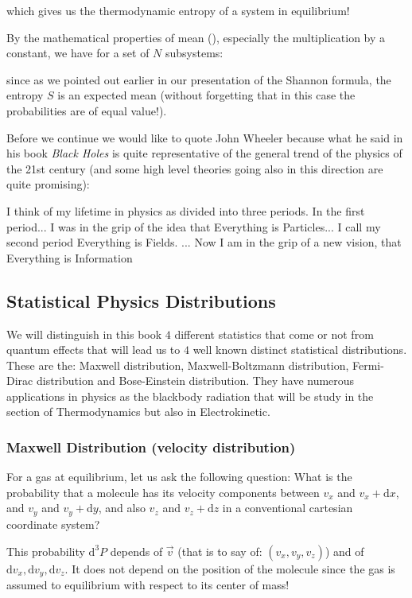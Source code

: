 	which gives us the thermodynamic entropy of a system in equilibrium!
	
	By the mathematical properties of mean (), especially the multiplication by a constant, we have for a set of $N$ subsystems:
	
	since as we pointed out earlier in our presentation of the Shannon formula, the entropy $S$ is an expected mean (without forgetting that in this case the probabilities are of equal value!).
	
	Before we continue we would like to quote John Wheeler because what he said in his book \textit{Black Holes} is quite representative of the general trend of the physics of the 21st century (and some high level theories going also in this direction are quite promising):
	
	\begin{fquote}[] I think of my lifetime in physics as divided into three periods. In the first period... I was in the grip of the idea that Everything is Particles... I call my second period Everything is Fields. ... Now I am in the grip of a new vision, that Everything is Information 
 	\end{fquote}
	
	\subsection{Statistical Physics Distributions}
	We will distinguish in this book $4$ different statistics that come or not from quantum effects that will lead us to $4$ well known distinct statistical distributions. These are the: Maxwell distribution, Maxwell-Boltzmann distribution, Fermi-Dirac distribution and Bose-Einstein distribution. They have numerous applications in physics as the blackbody radiation that will be study in the section of Thermodynamics but also in Electrokinetic.
	
	\subsubsection{Maxwell Distribution (velocity distribution)}
	For a gas at equilibrium, let us ask the following question: What is the probability that a molecule has its velocity components between $v_x$ and $v_x+\mathrm{d}x$, and $v_y$ and $v_y+\mathrm{d}y$, and also $v_z$ and $v_z+\mathrm{d}z$ in a conventional cartesian coordinate system?
	
	This probability $\mathrm{d}^3P$ depends of $\vec{v}$ (that is to say of: $(v_x,v_y,v_z)$) and of $\mathrm{d}v_x,\mathrm{d}v_y,\mathrm{d}v_z$. It does not depend on the position of the molecule since the gas is assumed to equilibrium with respect to its center of mass!
	
